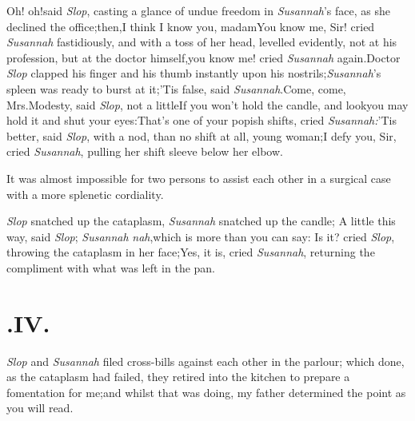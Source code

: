 \documentclass{article}
\begin{document}
\tsh Oh! oh!\tsh said \textit{Slop},
casting a glance of undue freedom in \textit{Susannah}’s face,
as she declined the office;\tsk then,\break I think I know you,
madam\tsh You\break
know me, Sir! cried \textit{Susannah} fastidi\-ously, and with a
toss of her head, le\-velled evidently, not
at his profession, but at the doctor himself,\tsk you know\break
me! cried \textit{Susannah} again.\tsk Doctor \textit{Slop}
clapped his finger and his thumb\break
instantly upon his nostrils;\tsh \textit{Susan\-nah}’s spleen was ready to
burst at it;\tsh ’Tis false, said
\textit{Susannah}.\tsk Come, come, Mrs.\@ Modesty, said \textit{Slop},
not a little\break{}\break\tsh If you won’t hold the candle, and
look\tsk you may hold it and shut your eyes:\tsk That’s
one of your popish shifts, cried \textit{Susannah:}\tsk ’Tis
better, said \textit{Slop}, with a nod, than no shift at all, young
woman;\tsh I defy you, Sir, cried \textit{Su\-sannah}, pulling
her shift sleeve below her elbow.

It was almost impossible for two persons to assist each other in
a surgical case with a more splenetic cordiality.


\textit{Slop} snatched up the cataplasm,\tsh\break
\textit{Susannah} snatched up the candle;\tsh\break
A little this way, said \textit{Slop}; \textit{Susannah}
\textit{nah},\tsk which is more than you can say:
\tsh Is it?  cried \textit{Slop}, throwing the cataplasm in her
face;\tsh Yes, it is, cried \textit{Susannah}, returning the
compliment with what was left in the pan.\tsh

\vskip -6pt

\section{.\enspace IV.}

 \textit{Slop} and
\textit{Susannah} filed cross-bills against each other in the
parlour; which done, as the cataplasm had failed, they retired into
the kitchen to prepare a fomentation for me;\tsk and whilst that was doing, my father determined the
point as you will read.
\end{document}
